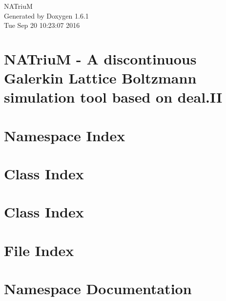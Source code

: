 \documentclass[a4paper]{book}
\begin{document}
\hypersetup{pageanchor=false}
\begin{titlepage}
\vspace*{7cm}
\begin{center}
{\Large NATriuM }\\
\vspace*{1cm}
{\large Generated by Doxygen 1.6.1}\\
\vspace*{0.5cm}
{\small Tue Sep 20 10:23:07 2016}\\
\end{center}
\end{titlepage}
\clearemptydoublepage
{}
\tableofcontents
\clearemptydoublepage
{}
\hypersetup{pageanchor=true}
\chapter{NATriuM -\/ A discontinuous Galerkin Lattice Boltzmann simulation tool based on deal.II}
\label{index}\hypertarget{index}{}
\chapter{Namespace Index}

\chapter{Class Index}

\chapter{Class Index}

\chapter{File Index}

\chapter{Namespace Documentation}




\end{document}
